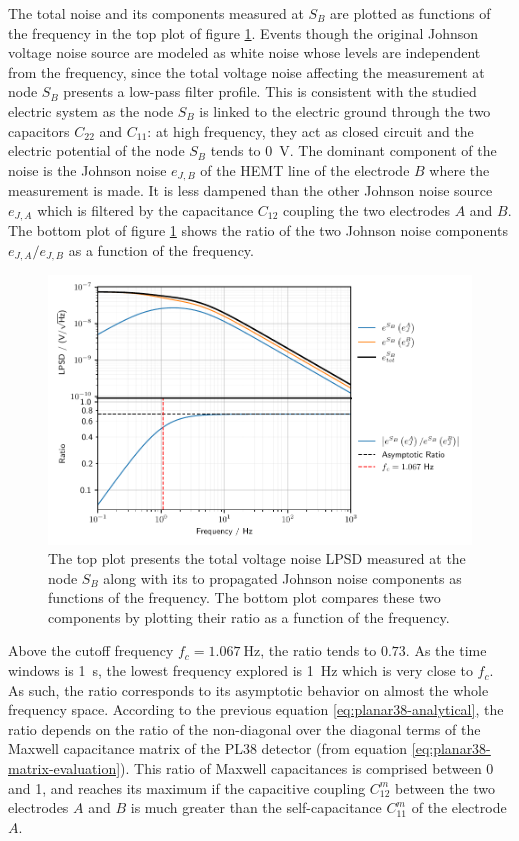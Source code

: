 The total noise and its components measured at $S_B$ are plotted as functions of the frequency in the top plot of figure \ref{fig:planar38-analytical-results}. Events though the original Johnson voltage noise source are modeled as white noise whose levels are independent from the frequency, since the total voltage noise affecting the measurement at node $S_B$ presents a low-pass filter profile. This is consistent with the studied electric system as the node $S_B$ is linked to the electric ground through the two capacitors $C_{22}$ and $C_{11}$: at high frequency, they act as closed circuit and the electric potential of the node $S_B$ tends to \SI{0}{\volt}. The dominant component of the noise is the Johnson noise $e_{J,B}$ of the HEMT line of the electrode $B$ where the measurement is made. It is less dampened than the other Johnson noise source $e_{J,A}$ which is filtered by the capacitance $C_{12}$ coupling the two electrodes $A$ and $B$. The bottom plot of figure \ref{fig:planar38-analytical-results} shows the ratio of the two Johnson noise components $e_{J,A}/e_{J,B}$ as a function of the frequency.

\begin{figure}
\centering
\includegraphics[scale=1]{Figures/Electrodes/pl38_analytical_noise_propagation.pdf}
\caption{The top plot presents the total voltage noise LPSD measured at the node $S_B$ along with its to propagated Johnson noise components as functions of the frequency. The bottom plot compares these two components by plotting their ratio as a function of the frequency.
}
\label{fig:planar38-analytical-results}
\end{figure}

Above the cutoff frequency $f_c = \SI{1.067}{\Hz}$, the ratio tends to $0.73$. As the time windows is \SI{1}{\s}, the lowest frequency explored is \SI{1}{\Hz} which is very close to $f_c$. As such, the ratio corresponds to its asymptotic behavior on almost the whole frequency space. According to the previous equation \ref{eq:planar38-analytical}, the ratio depends on the ratio of the non-diagonal over the diagonal terms of the Maxwell capacitance matrix of the PL38 detector (from equation \ref{eq:planar38-matrix-evaluation}). This ratio of Maxwell capacitances is comprised between 0 and 1, and reaches its maximum if the capacitive coupling $C_{12}^m$ between the two electrodes $A$ and $B$ is much greater than the self-capacitance $C_{11}^m$ of the electrode $A$.

